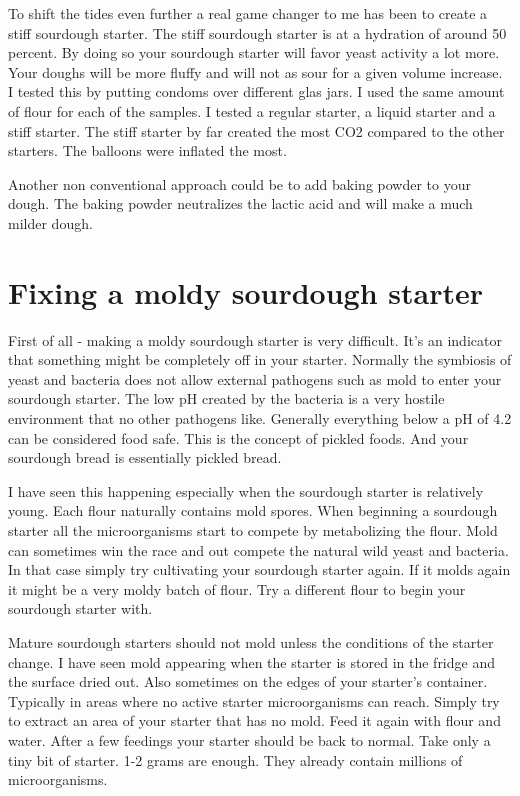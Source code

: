 To shift the tides even further a real game changer
to me has been to create a stiff sourdough starter. The
stiff sourdough starter is at a hydration of around 50 percent.
By doing so your sourdough starter will favor yeast
activity a lot more. Your doughs will be more fluffy and will
not as sour for a given volume increase. I tested this
by putting condoms over different glas jars. I used
the same amount of flour for each of the samples.
I tested a regular starter, a liquid starter and a stiff
starter. The stiff starter by far created the most CO2
compared to the other starters. The balloons were inflated
the most. \cite{stiff+starter}

Another non conventional approach could be to add baking
powder to your dough. The baking powder neutralizes the
lactic acid and will make a much milder dough.\cite{baking+powder+reduce-acidity}

\section{Fixing a moldy sourdough starter}

First of all - making a moldy sourdough starter is very difficult.
It's an indicator that something might be completely off in your starter.
Normally the symbiosis of yeast and bacteria does not allow external
pathogens such as mold to enter your sourdough starter.
The low pH created by the bacteria is a very hostile environment
that no other pathogens like. Generally everything below a pH
of 4.2 can be considered food safe\cite{food+safe+ph}. This
is the concept of pickled foods. And your sourdough bread
is essentially pickled bread.

I have seen this happening especially when the sourdough
starter is relatively young. Each flour naturally contains
mold spores. When beginning a sourdough starter all
the microorganisms start to compete by metabolizing the
flour. Mold can sometimes win the race and out compete
the natural wild yeast and bacteria. In that case simply
try cultivating your sourdough starter again. If it molds
again it might be a very moldy batch of flour. Try a different
flour to begin your sourdough starter with.

Mature sourdough starters should not mold unless the conditions
of the starter change. I have seen mold appearing when the starter is stored
in the fridge and the surface dried out. Also sometimes on the
edges of your starter's container. Typically in areas where no active
starter microorganisms can reach. Simply try to extract an
area of your starter that has no mold. Feed it again with flour and
water. After a few feedings your starter should be back to normal.
Take only a tiny bit of starter. 1-2 grams are enough. They already
contain millions of microorganisms.

